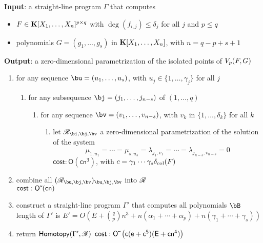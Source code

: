 \documentclass[12pt]{article}
\begin{document}
\begin{algorithm}
\caption{$\mathsf{ColumnDegree}(\Gamma)$}
{\bf Input}: a straight-line program $\Gamma$ that computes 
\begin{itemize}  
\setlength\itemsep{0em}
\item $F \in \mathbf{K}[X_1, \ldots, X_n]^{p \times q}$ with $\deg(f_{i,j}) \leq \delta_j$ for all $j$ and $p \le q$
\item polynomials $G = (g_1, \ldots, g_s)$ in $\mathbf{K}[X_1, \ldots, X_n]$, with $n=q-p+s+1$
\end{itemize}
{\bf Output}: a zero-dimensional parametrization of the isolated points of $V_{p}({F},G)$
\begin{enumerate}\setlength\itemsep{0em}
\item for any sequence $\bu=(u_1,\dots,u_s)$, with $u_j \in \{1,\dots,\gamma_j\}$ for all $j$
\begin{enumerate}\setlength\itemsep{0em}
\item for any subsequence $\bj=(j_1,\dots,j_{n-s})$ of $(1,\dots,q)$
\begin{enumerate}\setlength\itemsep{0em}
\item for any sequence $\bv=(v_1,\dots,v_{n-s})$, with $v_k$ in $\{1,\dots,\delta_k\}$ for all $k$
\begin{enumerate}\setlength\itemsep{0em}
 \item let $\scrR_{\bi,\bj,\bv}$ a zero-dimensional parametrization of the solution of the system 
$$\mu_{1,u_1}=\cdots=\mu_{s,u_s}=\lambda_{j_1,v_1}=\cdots=\lambda_{j_{n-s},v_{n-s}}=0$$
$\mathsf{cost: O(cn^3)}$, with $c=\gamma_1\cdots\gamma_s \delta_{\rm col}({F})$
\end{enumerate}
\end{enumerate}
\end{enumerate}
\item combine all $(\scrR_{\bu,\bj,\bv})_{\bu,\bj,\bv}$ into $\mathscr{R}$\\
$\mathsf{cost: {O}{\,\tilde{ }\,}(cn)}$

\item construct a straight-line program $\Gamma'$ that computes all polynomials $\bB$\\
  length of $\Gamma'$ is $E'=O(E + {q \choose p} n^3 + n
(\alpha_1+\cdots+\alpha_p) + n(\gamma_1 + \cdots + \gamma_s))$

\item return $\mathsf{Homotopy}(\Gamma',\mathscr{R})$ 
$\mathsf{cost: {O}{\,\tilde{ }\,}\left (c(e+c^5 )(E + cn^4)\right)}$
\end{enumerate}
\label{ColHom}
\end{algorithm}
\end{document}
